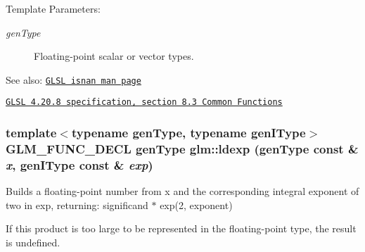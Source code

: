 \begin{Desc}
\item[Template Parameters:]
\begin{description}
\item[{\em genType}]Floating-point scalar or vector types.\end{description}
\end{Desc}
\begin{Desc}
\item[See also:]\href{http://www.opengl.org/sdk/docs/manglsl/xhtml/isnan.xml}{\tt GLSL isnan man page} 

\href{http://www.opengl.org/registry/doc/GLSLangSpec.4.20.8.pdf}{\tt GLSL 4.20.8 specification, section 8.3 Common Functions} \end{Desc}
\hypertarget{group__core__func__common_g4b829eccd70b08b1a349e42ae3d4f4f7}{
\subsubsection[ldexp]{\setlength{\rightskip}{0pt plus 5cm}template$<$typename genType, typename genIType$>$ GLM\_\-FUNC\_\-DECL genType glm::ldexp (genType const \& {\em x}, \/  genIType const \& {\em exp})}}
\label{group__core__func__common_g4b829eccd70b08b1a349e42ae3d4f4f7}


Builds a floating-point number from x and the corresponding integral exponent of two in exp, returning: significand $\ast$ exp(2, exponent)

If this product is too large to be represented in the floating-point type, the result is undefined.

